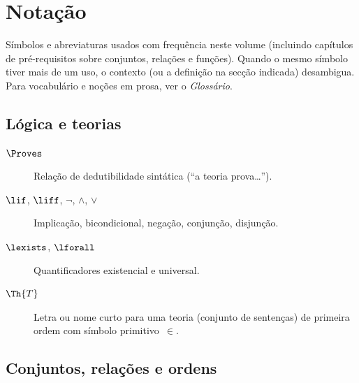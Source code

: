 
\clearpage
{}
\chapter*{Notação}

\noindent
Símbolos e abreviaturas usados com frequência neste volume (incluindo capítulos de pré-requisitos sobre conjuntos, relações e funções). Quando o mesmo símbolo tiver mais de um uso, o contexto (ou a definição na secção indicada) desambigua. Para vocabulário e noções em prosa, ver o \emph{Glossário}.

\section*{Lógica e teorias}

\begin{description}
\item[$\Proves$] Relação de dedutibilidade sintática (``a teoria prova\ldots'').
\item[$\lif$, $\liff$, $\lnot$, $\land$, $\lor$] Implicação, bicondicional, negação, conjunção, disjunção.
\item[$\lexists$, $\lforall$] Quantificadores existencial e universal.
\item[$\Th{T}$] Letra ou nome curto para uma teoria (conjunto de sentenças) de primeira ordem com símbolo primitivo~$\in$.
\end{description}

\section*{Conjuntos, relações e ordens}

